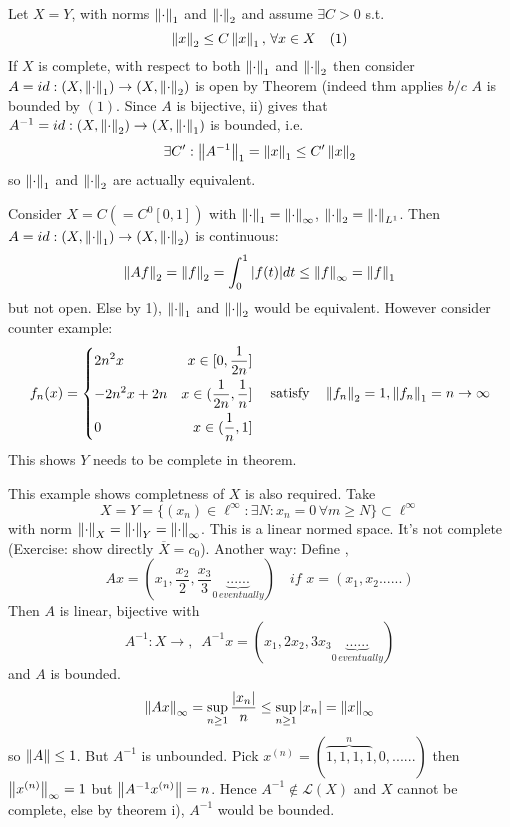 \documentclass{article}
\begin{document}
\begin{example}\nl
Let $X=Y$, with norms $\left\|{\cdot}\right\|_1$ and $\left\|{\cdot}\right\|_2$ and assume $\exists C>0$ s.t. $$\left\|{x}\right\|_2\leq C\left\|{x}\right\|_1,\,\forall x\in X\quad(1)$$
If $X$ is complete, with respect to both $\left\|{\cdot}\right\|_1$ and $\left\|{\cdot}\right\|_2$ then consider $A=id:(X,\left\|{\cdot}\right\|_1)\to(X,\left\|{\cdot}\right\|_2)$ is open by Theorem (indeed thm applies $b/c$ $A$ is bounded by $(1)$. Since $A$ is bijective, ii) gives that $A^{-1}=id:(X,\left\|{\cdot}\right\|_2)\to(X,\left\|{\cdot}\right\|_1)$ is bounded, i.e.
$$
\exists C': \left\|{A^{-1}}\right\|_1=\left\|{x}\right\|_1\leq C'\left\|{x}\right\|_2
$$
so $\left\|{\cdot}\right\|_1$ and $\left\|{\cdot}\right\|_2$ are actually equivalent.
\end{example}

\begin{example}[Completeness of $Y$]\nl
Consider $X=C(=C^0[0,1])$ with $\left\|{\cdot}\right\|_1=\left\|{\cdot}\right\|_\infty$, $\left\|{\cdot}\right\|_2=\left\|{\cdot}\right\|_{L^1}$. Then $A=id:(X,\left\|{\cdot}\right\|_1)\to(X,\left\|{\cdot}\right\|_2)$ is continuous:
$$
\left\|{Af}\right\|_2
=\left\|{f}\right\|_2
=\int_0^1|f(t)|dt
\leq\left\|{f}\right\|_\infty
=\left\|{f}\right\|_1
$$
but not open. Else by 1),  $\left\|{\cdot}\right\|_1$ and $\left\|{\cdot}\right\|_2$ would be equivalent. However consider counter example:
\begin{equation}\nonumber
f_n(x)=\left\{
\begin{split}
    &{2n^2x} &x\in[0,\frac{1}{2n}]\\
    &{-2n^2x+2n} &x\in(\frac{1}{2n},\frac{1}{n}]\\
    &0 &x\in(\frac{1}{n},1]\\
\end{split}
\right.\quad\text{satisfy}\quad\left\|{f_n}\right\|_2=1,\left\|{f_n}\right\|_1=n\to\infty
\end{equation}
This shows $Y$ needs to be complete in theorem.
\end{example}
\begin{example}[Completeness of $X$]\nl
This example shows completness of $X$ is also required.
Take 
$$
X=Y=\{(x_n)\in\ell^\infty:\exists N:x_n=0\,\forall m\geq N\}\subset\ell^\infty
$$
with norm $\left\|{\cdot}\right\|_X=\left\|{\cdot}\right\|_Y=\left\|{\cdot}\right\|_\infty$. This is a linear normed space. It's not complete (Exercise: show directly $\overline{X}=c_0$). Another way:
Define , 
$$
Ax=(x_1,\frac{x_2}{2},\frac{x_3}{3}\underbrace{......}_{0\,eventually})\quad if \,\,x=(x_1,x_2......)
$$
Then $A$ is linear, bijective with 
$$
A^{-1}:X\to ,\,\,\,A^{-1}x=(x_1,2x_2,3x_3\underbrace{......}_{0\,eventually})
$$
and $A$ is bounded. 
$$
\left\|{Ax}\right\|_\infty=\sup_{n\geq1}\frac{|x_n|}{n}\leq\sup_{n\geq1}|x_n|=\left\|{x}\right\|_\infty
$$
so $\left\|{A}\right\|\leq1$. But $A^{-1}$ is unbounded. 
Pick $x^{(n)}=(\overbrace{1,1,1,1}^{n},0,......)$ then $\left\|{x^{(n)}}\right\|_\infty=1$ but $\left\|{A^{-1}x^{(n)}}\right\|=n$. Hence $A^{-1}\not\in\mathcal{L}(X)$ and $X$ cannot be complete, else by theorem i), $A^{-1}$ would be bounded.
\end{example}
\end{document}
